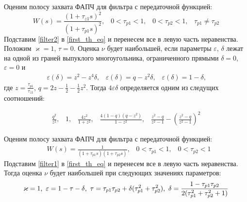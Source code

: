\documentclass[a4paper,article,14pt]{extarticle}
\begin{document}

Оценим полосу захвата ФАПЧ для фильтра с передаточной функцией:
 \begin{equation}\label{filter2}
W(s) = \frac{(1+\tau_{z1}s)^2}{(1+\tau_{p1}s)^2}\text{,} \quad0 < \tau_{p1} < 1 \text{,} \quad 0 < \tau_{p2} <1 \text{,} \quad \tau_{p1} \neq \tau_{p2}
 \end{equation}
Подставим \eqref{filter2} в \eqref{first_th_eq} и перенесем все в левую часть неравенства. Положим $\varkappa = 1$, $\tau = 0$. Оценка $\nu$ будет наибольшей, если параметры $\varepsilon$, $\delta$ лежат на одной из граней выпуклого многоугольника, ограниченного прямыми $\delta = 0$, $\varepsilon = 0$ и 
 \begin{equation*}
\begin{aligned}
\varepsilon(\delta)=z^2 - z^4\delta \text{,} \quad \varepsilon(\delta)=q - z^2\delta \text{,}
\quad \varepsilon(\delta)=1 - \delta \text{,}
\end{aligned}
\end{equation*}
где $z = \frac{\tau_{p1}}{\tau_{z1}}$, $q = 2z - \frac{1}{2} - \frac{1}{2}z^2$. 
Тогда $4\varepsilon\delta$ определяется одним из следущих соотношений:

 \begin{equation}\label{filter2_max}
\begin{aligned}
\frac{q^2}{z^2}\text{,} \quad 1 \text{,} \quad \frac{4z^2}{1+z^2} \text{,} \quad \frac{4(1-q)(q-z^2)}{1-z^2} \text{,} \quad \frac{z^2-q}{z^2-1} - \left(\frac{z^2-q}{z^2-1}\right)^2
\end{aligned}
\end{equation}

Оценим полосу захвата ФАПЧ для фильтра с передаточной функцией:
 \begin{equation}\label{filter1}
 \begin{aligned}
&W(s) = \frac{1}{(1+\tau_{p1}s)(1+\tau_{p2}s)} \text{,} \quad0 < \tau_{p1} < 1 \text{,} \quad 0 < \tau_{p2} <1
 \end{aligned}
\end{equation}
Подставим \eqref{filter1} в \eqref{first_th_eq} и перенесем все в левую часть неравенства. Тогда оценка $\nu$ будет наибольшей при следующих значениях параметров:
 \begin{equation*}
 \begin{aligned}
\varkappa = 1 \text{,} \enskip  \varepsilon = 1 - \tau - \delta \text{,} \enskip \tau = \tau_{p1}\tau_{p2} + \delta(\tau_{p1}^2+\tau_{p2}^2) \text{,} \enskip \delta = \frac{1-\tau_{p1}\tau_{p2}}{2(\tau_{p1}^2+\tau_{p2}^2 + 1)}
 \end{aligned}
\end{equation*}
\end{document}
